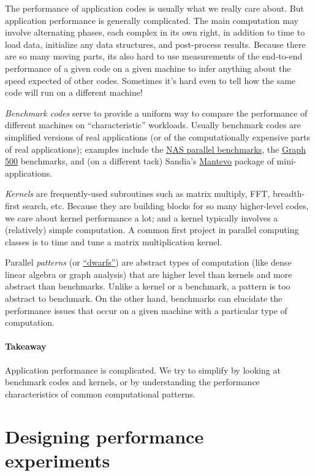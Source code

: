 \documentclass[12pt, leqno]{article} %
\begin{document}
The performance of application codes is usually what we really care
about. But application performance is generally complicated. The main
computation may involve alternating phases, each complex in its own
right, in addition to time to load data, initialize any data structures,
and post-process results. Because there are so many moving parts, its
also hard to use measurements of the end-to-end performance of a given
code on a given machine to infer anything about the speed expected of
other codes. Sometimes it's hard even to tell how the same code will run
on a different machine!

\emph{Benchmark codes} serve to provide a uniform way to compare the
performance of different machines on ``characteristic'' workloads.
Usually benchmark codes are simplified versions of real applications (or
of the computationally expensive parts of real applications); examples
include the \href{https://www.nas.nasa.gov/publications/npb.html}{NAS
parallel benchmarks}, the \href{http://www.graph500.org/}{Graph 500}
benchmarks, and (on a different tack) Sandia's
\href{https://mantevo.org/}{Mantevo} package of mini-applications.

\emph{Kernels} are frequently-used subroutines such as matrix multiply,
FFT, breadth-first search, etc. Because they are building blocks for so
many higher-level codes, we care about kernel performance a lot; and a
kernel typically involves a (relatively) simple computation. A common
first project in parallel computing classes is to time and tune a matrix
multiplication kernel.

Parallel \emph{patterns} (or
\href{www.eecs.berkeley.edu/Pubs/TechRpts/2006/EECS-2006-183.pdf}{``dwarfs''})
are abstract types of computation (like dense linear algebra or graph
analysis) that are higher level than kernels and more abstract than
benchmarks. Unlike a kernel or a benchmark, a pattern is too abstract to
benchmark. On the other hand, benchmarks can elucidate the performance
issues that occur on a given machine with a particular type of
computation.

\paragraph{Takeaway}

Application performance is complicated. We try to simplify by looking at
benchmark codes and kernels, or by understanding the performance
characteristics of common computational patterns.

\section{Designing performance experiments}
\end{document}
